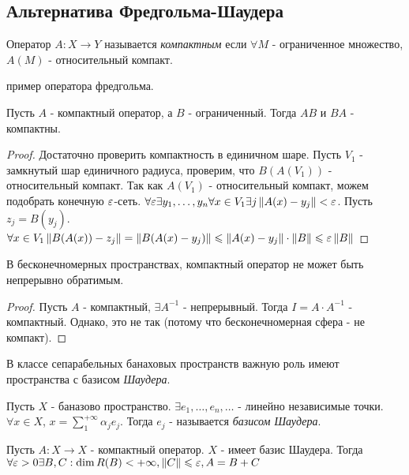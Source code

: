 \subsection{Альтернатива Фредгольма-Шаудера}

\begin{definition}
    Оператор $A: X \rightarrow Y$ называется \textit{компактным} если $\forall M$ - ограниченное множество, $A(M)$ - относительный компакт.
\end{definition}

\todo пример оператора фредгольма.

\begin{statement}
    Пусть $A$ - компактный оператор, а $B$ - ограниченный. Тогда $AB$ и $BA$ - компактны.
\end{statement}
 
\begin{proof}
    Достаточно проверить компактность в единичном шаре.
    Пусть $V_1$ - замкнутый шар единичного радиуса, проверим, что $B(A(V_1))$ - относительный компакт.
    Так как $A(V_1)$ - относительный компакт, можем подобрать конечную $\varepsilon$-сеть. 
    $\forall \varepsilon \exists y_1,  \dots, y_n \forall x \in V_1 \exists j \left\|A(x) - y_j\right\| < \varepsilon$. Пусть $z_j = B(y_j)$. 
    $\forall x \in V_1 \left\|B(A(x)) - z_j\right\| = \left\|B(A(x) - y_j)\right\| \leqslant \left\|A(x) - y_j\right\| \cdot \left\|B\right\| \leqslant \varepsilon\left\|B\right\|$
\end{proof}

\begin{statement}
    В бесконечномерных пространствах, компактный оператор не может быть непрерывно обратимым.
\end{statement}
\begin{proof}
    Пусть $A$ - компактный, $\exists A^{-1}$ - непрерывный. Тогда $I = A\cdot A^{-1}$ - компактный. Однако, это не так (потому что бесконечномерная сфера - не компакт).
\end{proof}

В классе сепарабельных банаховых пространств важную роль имеют пространства с базисом \textit{Шаудера}.

\begin{definition}
    Пусть $X$ - баназово пространство. $\exists e_1, \dots, e_n, \dots$ - линейно независимые точки. $\forall x \in X$, $x = \sum_{1}^{+\infty} \alpha_j e_j$.
    Тогда ${e_j}$ - называется \textit{базисом Шаудера}.
\end{definition}

\begin{theorem}
    Пусть $A: X \rightarrow X$ - компактный оператор. $X$ - имеет базис Шаудера. Тогда 
    $\forall \varepsilon > 0 \exists B, C: \dim R(B) < +\infty, \left\|C\right\| \leqslant \varepsilon, A = B + C$
\end{theorem}

